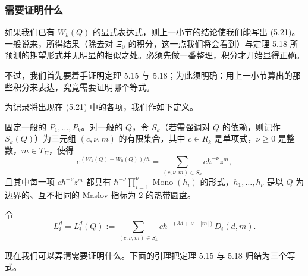 
\subsubsection{需要证明什么}

如果我们已有 $W_k(Q)$ 的显式表达式，则上一小节的结论使我们能写出 (5.21)。一般说来，所得结果（除去对 $\Xi_0$ 的积分，这一点我们将会看到）与定理 5.18 所预测的期望形式并无明显的相似之处。必须先做一番整理，积分才开始显得正确。

不过，我们首先要着手证明定理 5.15 与 5.18；为此须明确：用上一小节算出的那些积分来表达，究竟需要证明哪个等式。

为记录将出现在 (5.21) 中的各项，我们作如下定义。

\begin{definition}
  固定一般的 $P_1,\ldots,P_k$。对一般的 $Q$，令 $S_k$（若需强调对 $Q$ 的依赖，则记作 $S_k(Q)$）为三元组 $(c,\nu,m)$ 的有限集合，其中 $c\in R_k$ 是单项式，$\nu\ge 0$ 是整数，$m\in T_\Sigma$，使得
  \begin{equation}
    e^{(W_k(Q)-W_0(Q))/\hbar}=\sum_{(c,\nu,m)\in S_k}c\hbar^{-\nu}z^m, \tag{5.22}
  \end{equation}
  且其中每一项 $c\hbar^{-\nu}z^m$ 都具有 $\hbar^{-\nu}\prod_{i=1}^{\nu}\operatorname{Mono}(h_i)$ 的形式，$h_1,\ldots,h_\nu$ 是以 $Q$ 为边界的、互不相同的 Maslov 指标为 $2$ 的热带圆盘。
\end{definition}

令
\[
  L_i^d=L_i^d(Q):=\sum_{(c,\nu,m)\in S_k}c\hbar^{-(3d+\nu-|m|)}D_i(d,m).
\]

现在我们可以弄清需要证明什么。下面的引理把定理 5.15 与 5.18 归结为三个等式。

